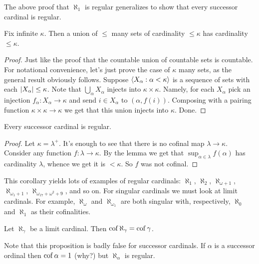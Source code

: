\documentclass[10pt]{amsart}
\begin{document}
The above proof that $\aleph_1$ is regular generalizes to show that every successor cardinal is regular. 

\begin{lemma}
Fix infinite $\kappa$. Then a union of $\le$ many sets of cardinality $\le \kappa$ has cardinality $\le \kappa$.
\end{lemma}

\begin{proof}
Just like the proof that the countable union of countable sets is countable. For notational convenience, let's just prove the case of $\kappa$ many sets, as the general result obviously follows. Suppose ${\left\langle X_\alpha : \alpha < \kappa \right\rangle}$ is a sequence of sets with each $\left\lvert X_\alpha \right\rvert \le \kappa$. Note that $\bigcup_\alpha X_\alpha$ injects into $\kappa \times \kappa$. Namely, for each $X_\alpha$ pick an injection $f_\alpha : X_\alpha \to \kappa$ and send $i \in X_\alpha$ to $(\alpha,f(i))$. Composing with a pairing function $\kappa \times \kappa \to \kappa$ we get that this union injects into $\kappa$. Done.
\end{proof}

\begin{corollary}
Every successor cardinal is regular.
\end{corollary}

\begin{proof}
Let $\kappa = \lambda^+$. It's enough to see that there is no cofinal map $\lambda \to \kappa$. Consider any function $f : \lambda \to \kappa$. By the lemma we get that $\sup_{\alpha \in \lambda} f(\alpha)$ has cardinality $\lambda$, whence we get it is $< \kappa$. So $f$ was not cofinal.
\end{proof}

This corollary yields lots of examples of regular cardinals: $\aleph_1$, $\aleph_2$, $\aleph_{\omega+1}$, $\aleph_{\omega_1+1}$, $\aleph_{\omega_{17}+\omega^2+9}$, and so on. For singular cardinals we must look at limit cardinals. For example, $\aleph_{\omega}$ and $\aleph_{\omega_1}$ are both singular with, respectively, $\aleph_0$ and $\aleph_1$ as their cofinalities. 

\begin{proposition}
Let $\aleph_\gamma$ be a limit cardinal. Then $\operatorname{cof} \aleph_\gamma = \operatorname{cof} \gamma$. 
\end{proposition}

Note that this proposition is badly false for successor cardinals. If $\alpha$ is a successor ordinal then $\operatorname{cof} \alpha = 1$ (why?) but $\aleph_\alpha$ is regular.
\end{document}
